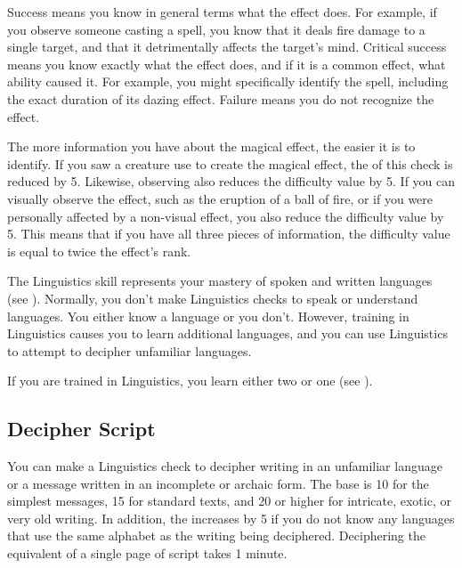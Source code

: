         Success means you know in general terms what the effect does.
        For example, if you observe someone casting a  spell, you know that it deals fire damage to a single target, and that it detrimentally affects the target's mind.
        Critical success means you know exactly what the effect does, and if it is a common effect, what ability caused it.
        For example, you might specifically identify the  spell, including the exact duration of its dazing effect.
        Failure means you do not recognize the effect.

        The more information you have about the magical effect, the easier it is to identify.
        If you saw a creature use  to create the magical effect, the  of this check is reduced by 5.
        Likewise, observing  also reduces the difficulty value by 5.
        If you can visually observe the effect, such as the eruption of a ball of fire, or if you were personally affected by a non-visual effect, you also reduce the difficulty value by 5.
        This means that if you have all three pieces of information, the difficulty value is equal to twice the effect's rank.

\newpage
{}
        The Linguistics skill represents your mastery of spoken and written languages (see ).
        Normally, you don't make Linguistics checks to speak or understand languages.
        You either know a language or you don't.
        However, training in Linguistics causes you to learn additional languages, and you can use Linguistics to attempt to decipher unfamiliar languages.

        If you are trained in Linguistics, you learn either two  or one  (see ).

    \subsection{Decipher Script}
        You can make a Linguistics check to decipher writing in an unfamiliar language or a message written in an incomplete or archaic form. The base  is 10 for the simplest messages, 15 for standard texts, and 20 or higher for intricate, exotic, or very old writing. In addition, the  increases by 5 if you do not know any languages that use the same alphabet as the writing being deciphered. Deciphering the equivalent of a single page of script takes 1 minute.

